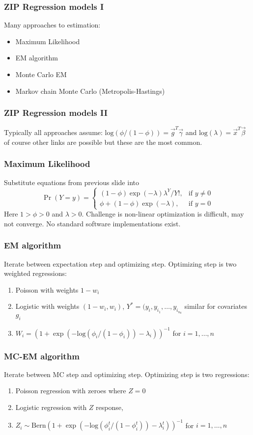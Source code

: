 \documentclass{beamer} %
\theoremstyle{definition} %
\begin{document}
\begin{frame}
\frametitle{ZIP Regression models I}
Many approaches to estimation:
\begin{itemize}
\item Maximum Likelihood
\item EM algorithm
\item Monte Carlo EM
\item Markov chain Monte Carlo (Metropolis-Hastings)
\end{itemize}
\end{frame}

\begin{frame}
\frametitle{ZIP Regression models II}
Typically all approaches assume: 
$\text{log}(\phi/(1-\phi)) = \vec{g}^T\vec{\gamma}$ 
and \vspace{0.35in}
$\text{log}(\lambda)=\vec{x}^T\vec{\beta}$
of course other links are possible but these are the most common. 
\end{frame}

\begin{frame}
\frametitle{Maximum Likelihood}
Substitute equations from previous slide into 
$$ \Pr(Y=y)=
\begin{cases}
(1-\phi)\exp(-\lambda)\lambda^Y/Y!, &\text{if }y\neq0 \\
\phi+(1-\phi)\exp(-\lambda), &\text{if }y=0
\end{cases}
$$
Here $1 > \phi > 0$ and $\lambda >0$.
Challenge is non-linear optimization is difficult, may not converge. No standard software implementations exist. 
\end{frame}

\begin{frame}
\frametitle{EM algorithm}
Iterate between expectation step and optimizing step. Optimizing step is two weighted regressions: 
 \begin{enumerate}
 \item Poisson with weights $1-w_i$
 \item Logistic with weights $(1-w_i, w_i)$, $Y^* = (y_i, y_{i_1}, \dots, y_{i_{n_0}}$ similar for covariates $g_i$ 
\item $W_i = (1+\exp(-\text{log}(\phi_i/(1-\phi_i)) -\lambda_i))^{-1}$ for $i=1, \dots, n$
\end{enumerate}
\end{frame}

\begin{frame}
\frametitle{MC-EM algorithm}
Iterate between MC step and optimizing step. Optimizing step is two regressions: 
 \begin{enumerate}
 \item Poisson regression with zeroes where $Z=0$
 \item Logistic regression with $Z$ response,  
\item $Z_i \sim \text{Bern}(1+\exp(-\text{log}(\phi^t_i/(1-\phi^t_i)) -\lambda^t_i))^{-1}$ for $i=1, \dots, n$
\end{enumerate}
\end{frame}
\end{document}

